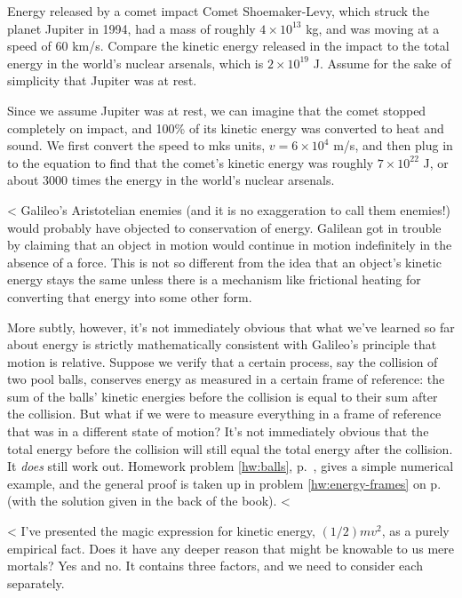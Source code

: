 \begin{eg}{Energy released by a comet impact}
\egquestion Comet Shoemaker-Levy, which struck the planet
Jupiter in 1994, had a mass of roughly $4\times10^{13}$ kg,
and was moving at a speed of 60 km/s. Compare the kinetic
energy released in the impact to the total energy in the
world's nuclear arsenals, which is $2\times10^{19}$ J. Assume
for the sake of simplicity that Jupiter was at rest.

\eganswer Since we assume Jupiter was at rest, we can
imagine that the comet stopped completely on impact, and
100\% of its kinetic energy was converted to heat and sound.
We first convert the speed to mks units, $v=6\times10^4$
m/s, and then plug in to the equation to find that the
comet's kinetic energy was roughly $7\times10^{22}$ J, or about
3000 times the energy in the world's nuclear arsenals.
\end{eg}

<%
Galileo's Aristotelian enemies (and it is no exaggeration to call them
enemies!) would probably have objected to conservation of
energy. Galilean got in trouble by claiming that an object in
motion would continue in motion indefinitely in the absence
of a force.  This is not so different from the idea that an
object's kinetic energy stays the same unless there is a
mechanism like frictional heating for converting that energy
into some other form.

More subtly, however, it's not immediately obvious that what
we've learned so far about energy is strictly mathematically
consistent with Galileo's principle that motion is relative.
Suppose we verify that a certain process, say the collision
of two pool balls, conserves energy as measured in a certain
frame of reference: the sum of the balls' kinetic energies
before the collision is equal to their sum after the
collision. But what if we were to
measure everything in a frame of reference that was in a
different state of motion? It's not immediately obvious that the
total energy before the collision will still equal the total
energy after the collision. 
It \emph{does} still work out. Homework problem \ref{hw:balls}, p.~\pageref{hw:balls},
gives a simple numerical example, and the general
proof is taken up in problem \ref{hw:energy-frames} on p.~\pageref{hw:energy-frames} (with the solution
given in the back of the book).
<%

<%
I've presented the magic expression for kinetic energy, $(1/2)mv^2$, as a purely empirical fact.
Does it have any deeper reason that might be knowable to us mere mortals? Yes and no. It contains
three factors, and we need to
consider each separately.

